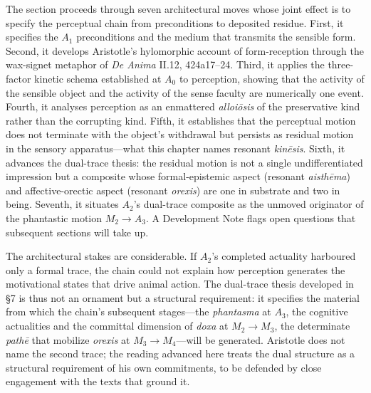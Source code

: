 \documentclass[12pt]{article}
\begin{document}
The section proceeds through seven architectural moves whose joint effect is to specify the perceptual chain from preconditions to deposited residue. First, it specifies the $A_1$ preconditions and the medium that transmits the sensible form. Second, it develops Aristotle's hylomorphic account of form-reception through the wax-signet metaphor of \textit{De Anima} II.12, 424a17--24. Third, it applies the three-factor kinetic schema established at $A_0$ to perception, showing that the activity of the sensible object and the activity of the sense faculty are numerically one event. Fourth, it analyses perception as an enmattered \textit{alloiōsis} of the preservative kind rather than the corrupting kind. Fifth, it establishes that the perceptual motion does not terminate with the object's withdrawal but persists as residual motion in the sensory apparatus---what this chapter names resonant \textit{kinēsis}. Sixth, it advances the dual-trace thesis: the residual motion is not a single undifferentiated impression but a composite whose formal-epistemic aspect (resonant \textit{aisthēma}) and affective-orectic aspect (resonant \textit{orexis}) are one in substrate and two in being. Seventh, it situates $A_2$'s dual-trace composite as the unmoved originator of the phantastic motion $M_2 \to A_3$. A Development Note flags open questions that subsequent sections will take up.

The architectural stakes are considerable. If $A_2$'s completed actuality harboured only a formal trace, the chain could not explain how perception generates the motivational states that drive animal action. The dual-trace thesis developed in §7 is thus not an ornament but a structural requirement: it specifies the material from which the chain's subsequent stages---the \textit{phantasma} at $A_3$, the cognitive actualities and the committal dimension of \textit{doxa} at $M_2 \to M_3$, the determinate \textit{pathē} that mobilize \textit{orexis} at $M_3 \to M_4$---will be generated. Aristotle does not name the second trace; the reading advanced here treats the dual structure as a structural requirement of his own commitments, to be defended by close engagement with the texts that ground it.
\end{document}
